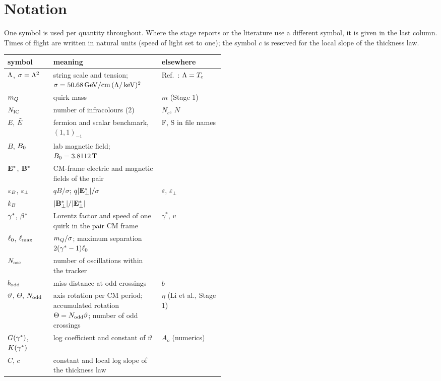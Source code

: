 \section{Notation}\label{app:notation}

One symbol is used per quantity throughout. Where the stage reports or the literature use a different symbol, it is
given in the last column. Times of flight are written in natural units (speed of light set to one); the symbol $c$ is reserved for the
local slope of the thickness law.

\begin{center}
\scriptsize
\begin{longtable}{l>{\raggedright\arraybackslash}p{0.50\linewidth}l}
\toprule
symbol & meaning & elsewhere\\
\midrule
\endhead
$\Lambda$, $\sigma=\Lambda^2$ & string scale and tension; $\sigma=50.68\,\mathrm{GeV}/\mathrm{cm}\,(\Lambda/\,\mathrm{keV})^2$ & Ref.~\cite{Asadi:2025btr}: $\Lambda=T_c$\\
$m_Q$ & quirk mass & $m$ (Stage 1)\\
$N_{\rm IC}$ & number of infracolours (2) & $N_c$, $N$\\
$E$, $\tilde{E}$ & fermion and scalar benchmark, $(1,1)_{-1}$ & F, S in file names\\
$B$, $B_0$ & lab magnetic field; $B_0=3.8112\,\mathrm{T}$ & \\
$\mathbf{E}^*$, $\mathbf{B}^*$ & CM-frame electric and magnetic fields of the pair & \\
$\varepsilon_B$, $\varepsilon_\perp$ & $qB/\sigma$; $q|\mathbf{E}^*_\perp|/\sigma$ & $\varepsilon$, $\varepsilon_\perp$\\
$k_B$ & $|\mathbf{B}^*_\perp|/|\mathbf{E}^*_\perp|$ & \\
$\gamma^*$, $\beta^*$ & Lorentz factor and speed of one quirk in the pair CM frame & $\gamma^*$, $v$\\
$\ell_0$, $\ell_{\max}$ & $m_Q/\sigma$; maximum separation $2(\gamma^*-1)\ell_0$ & \\
$N_{\rm osc}$ & number of oscillations within the tracker & \\
$b_{\rm odd}$ & miss distance at odd crossings & $b$\\
$\vartheta$, $\Theta$, $N_{\rm odd}$ & axis rotation per CM period; accumulated rotation $\Theta=N_{\rm odd}\vartheta$; number of odd crossings & $\eta$ (Li et al., Stage 1)\\
$G(\gamma^*)$, $K(\gamma^*)$ & log coefficient and constant of $\vartheta$ & $A_o$ (numerics)\\
$C$, $c$ & constant and local log slope of the thickness law & \\

\end{longtable}
\end{center}
